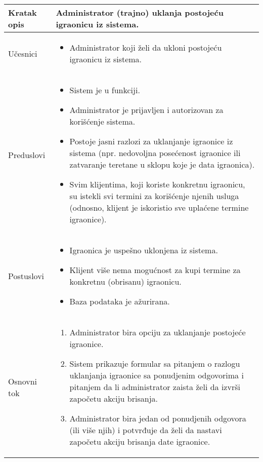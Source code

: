 \documentclass[../main.tex]{subfiles}
\begin{document}
\begin{longtable}{| p{} | p{} |} 

\hline
    Kratak opis &  Administrator (trajno) uklanja postojeću igraonicu iz sistema. \\ 
\hline    
    Učesnici & 
    	\begin{itemize}
        \item Administrator koji želi da ukloni postojeću igraonicu iz sistema.
     \end{itemize}\\
\hline
   Preduslovi & \begin{itemize}
       \item Sistem je u funkciji.
       \item Administrator je prijavljen i autorizovan za korišćenje sistema.
       \item Postoje jasni razlozi za uklanjanje igraonice iz sistema (npr. nedovoljna posećenost igraonice ili zatvaranje teretane u sklopu koje je data igraonica).
       \item Svim klijentima, koji koriste konkretnu igraonicu, su istekli svi termini za korišćenje njenih usluga (odnosno, klijent je iskoristio sve uplaćene termine igraonice).
   \end{itemize}\\
\hline  
    Postuslovi & \begin{itemize}
        \item Igraonica je uspešno uklonjena iz sistema.
        \item Klijent više nema mogućnost za kupi termine za konkretnu (obrisanu) igraonicu.
        \item Baza podataka je ažurirana.
    \end{itemize}\\
\hline
    Osnovni tok & \begin{enumerate}
        \item Administrator bira opciju za uklanjanje postojeće igraonice.
        \item Sistem prikazuje formular sa pitanjem o razlogu uklanjanja igraonice sa ponudjenim odgovorima i pitanjem da li administrator zaista želi da izvrši započetu akciju brisanja.
        \item Administrator bira jedan od ponudjenih odgovora (ili više njih) i potvrđuje da želi da nastavi započetu akciju brisanja date igraonice. 

\end{enumerate}
\end{longtable}
\end{document}
